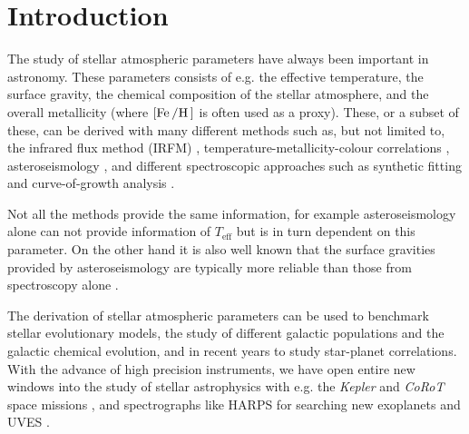 \documentclass[a4paper,fleqn,usenatbib]{mnras}
\begin{document}

\section{Introduction}
\label{sec:introduction}
% 


The study of stellar atmospheric parameters have always been important in astronomy. These
parameters consists of e.g. the effective temperature, the surface gravity, the chemical composition
of the stellar atmosphere, and the overall metallicity (where $[\ion{Fe}/\ion{H}]$ is often used as
a proxy). These, or a subset of these, can be derived with many different methods such as, but not
limited to, the infrared flux method (IRFM) \citep{Blackwell1977}, temperature-metallicity-colour
correlations \citep[see e.g.][]{Ramirez2005b}, asteroseismology \citep[see][for a classic
example]{Kjeldsen1995}, and different spectroscopic approaches such as synthetic fitting \citep[see
e.g.][]{Onehag2012,Tsantaki2017} and curve-of-growth analysis \citep[see e.g.][]{Sousa2008a,Andreasen2017a}.

Not all the methods provide the same information, for example asteroseismology alone can not provide
information of $T_\mathrm{eff}$ but is in turn dependent on this parameter. On the other hand it is
also well known that the surface gravities provided by asteroseismology are typically more reliable
than those from spectroscopy alone \citep[see e.g. the discussion by][]{Mortier2014}.

The derivation of stellar atmospheric parameters can be used to benchmark stellar evolutionary
models, the study of different galactic populations and the galactic chemical evolution, and in
recent years to study star-planet correlations. With the advance of high precision instruments, we
have open entire new windows into the study of stellar astrophysics with e.g. the \emph{Kepler} and
\emph{CoRoT} space missions \citep[see e.g.][]{ChristensenDalsgaard2010,Chaplin2011,Huber2014}, and
spectrographs like HARPS for searching new exoplanets \citep{HARPS} and UVES \citep{UVES}.
\end{document}
